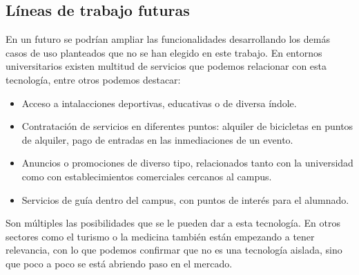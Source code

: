 \subsection{Líneas de trabajo futuras}


En un futuro se podrían ampliar las funcionalidades desarrollando los demás casos de uso planteados que no se han elegido en este trabajo. En entornos universitarios existen multitud de servicios que podemos relacionar con esta tecnología, entre otros podemos destacar: 


\begin{itemize}
\item Acceso a intalacciones deportivas, educativas o de diversa índole.
\item Contratación de servicios en diferentes puntos: alquiler de bicicletas en puntos de alquiler, pago de entradas en las inmediaciones de un evento.
\item Anuncios o promociones de diverso tipo, relacionados tanto con la universidad como con establecimientos comerciales cercanos al campus.
\item Servicios de guía dentro del campus, con puntos de interés para el alumnado.
\end{itemize}


Son múltiples las posibilidades que se le pueden dar a esta tecnología. En otros sectores como el turismo o la medicina también están empezando a tener relevancia, con lo que podemos confirmar que no es una tecnología aislada, sino que poco a poco se está abriendo paso en el mercado.









